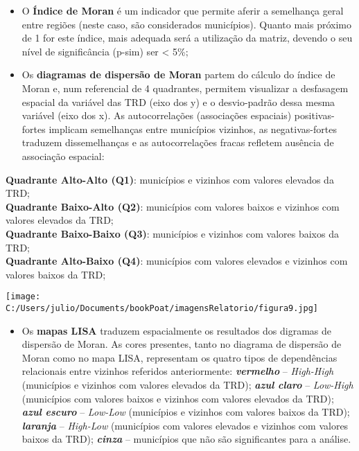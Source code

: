 \documentclass[
]{book}
\providecommand{\tightlist}{%
  \setlength{\itemsep}{0pt}\setlength{\parskip}{0pt}}
\begin{document}
\begin{itemize}
\tightlist
\item
  O \textbf{Índice de Moran} é um indicador que permite aferir a semelhança geral entre regiões (neste caso, são considerados municípios). Quanto mais próximo de 1 for este índice, mais adequada será a utilização da matriz, devendo o seu nível de significância (p-sim) ser \textless{} 5\%;
\item
  Os \textbf{diagramas de dispersão de Moran} partem do cálculo do índice de Moran e, num referencial de 4 quadrantes, permitem visualizar a desfasagem espacial da variável das TRD (eixo dos y) e o desvio-padrão dessa mesma variável (eixo dos x). As autocorrelações (associações espaciais) positivas-fortes implicam semelhanças entre municípios vizinhos, as negativas-fortes traduzem dissemelhanças e as autocorrelações fracas refletem ausência de associação espacial:
\end{itemize}

\textbf{Quadrante Alto-Alto (Q1)}: municípios e vizinhos com valores elevados da TRD;\\
\textbf{Quadrante Baixo-Alto (Q2)}: municípios com valores baixos e vizinhos com valores elevados da TRD;\\
\textbf{Quadrante Baixo-Baixo (Q3)}: municípios e vizinhos com valores baixos da TRD;\\
\textbf{Quadrante Alto-Baixo (Q4)}: municípios com valores elevados e vizinhos com valores baixos da TRD;

\texttt{[image: C:/Users/julio/Documents/bookPoat/imagensRelatorio/figura9.jpg]}

\begin{itemize}
\tightlist
\item
  Os \textbf{mapas LISA} traduzem espacialmente os resultados dos digramas de dispersão de Moran. As cores presentes, tanto no diagrama de dispersão de Moran como no mapa LISA, representam os quatro tipos de dependências relacionais entre vizinhos referidos anteriormente: \textbf{\emph{vermelho}} -- \emph{High-High} (municípios e vizinhos com valores elevados da TRD); \textbf{\emph{azul claro}} -- \emph{Low-High} (municípios com valores baixos e vizinhos com valores elevados da TRD); \textbf{\emph{azul escuro}} -- \emph{Low-Low} (municípios e vizinhos com valores baixos da TRD); \textbf{\emph{laranja}} -- \emph{High-Low} (municípios com valores elevados e vizinhos com valores baixos da TRD); \textbf{\emph{cinza}} -- municípios que não são significantes para a análise.
\end{itemize}
\end{document}

